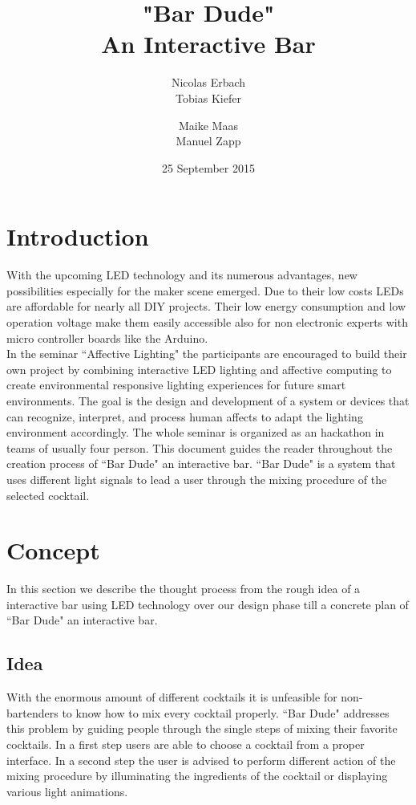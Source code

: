 \documentclass{acm_proc_article-sp}
\begin{document}
\title{"Bar Dude" \\ An Interactive Bar}

\author{
\alignauthor
Nicolas Erbach\\
\alignauthor
Tobias Kiefer\\
\and
\alignauthor Maike Maas\\
\alignauthor Manuel Zapp\\
}
\date{25 September 2015}

\maketitle

\section{Introduction}
With the upcoming LED technology and its numerous advantages, new possibilities especially for the maker scene emerged. Due to their low costs LEDs are affordable for nearly all DIY projects. Their low energy consumption and low operation voltage make them easily accessible also for non electronic experts with micro controller boards like the Arduino.\\
In the seminar ``Affective Lighting" the participants are encouraged to build their own project by combining interactive LED lighting and affective computing to create environmental responsive lighting experiences for future smart environments. The goal is the design and development of a system or devices that can recognize, interpret, and process human affects to adapt the lighting environment accordingly. The whole seminar is organized as an hackathon in teams of usually four person. This document guides the reader throughout the creation process of ``Bar Dude" an interactive bar. ``Bar Dude" is a system that uses different light signals to lead a user through the mixing procedure of the selected cocktail.

\section{Concept}
In this section we describe the thought process from the rough idea of a interactive bar using LED technology over our design phase till a concrete plan of ``Bar Dude" an interactive bar.
\subsection{Idea}
With the enormous amount of different cocktails it is unfeasible for non-bartenders to know how to mix every cocktail properly. ``Bar Dude" addresses this problem by guiding people through the single steps of mixing their favorite cocktails. In a first step users are able to choose a cocktail from a proper interface. In a second step the user is advised to perform different action of the mixing procedure by illuminating the ingredients of the cocktail or displaying various light animations.
\end{document}
